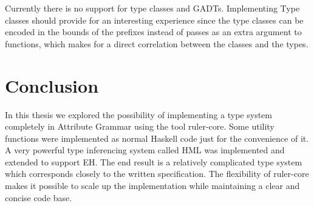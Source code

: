 \documentclass[twoside, titlepage, openright, a4paper]{book}
\begin{document}
Currently there is no support for type classes and GADTs. Implementing Type classes should provide for an interesting experience since the type classes can be encoded in the bounds of the prefixes instead of passes as an extra argument to functions, which makes for a direct correlation between the classes and the types.
\section{Conclusion}
In this thesis we explored the possibility of implementing a type system completely in Attribute Grammar using the tool ruler-core. Some utility functions were implemented as normal Haskell code just for the convenience of it. A very powerful type inferencing system called HML was implemented and extended to support EH. The end result is a relatively complicated type system which corresponds closely to the written specification. The flexibility of ruler-core makes it possible to scale up the implementation while maintaining a clear and concise code base.

\printglossaries
\printindex

\appendix
\end{document}
